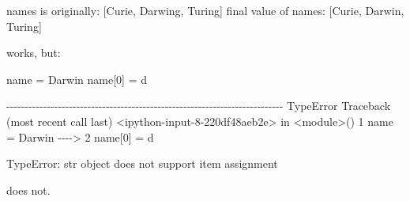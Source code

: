 \documentclass[
  letterpaper,
  DIV=11,
  numbers=noendperiod]{scrartcl}
\newenvironment{Shaded}{\begin{snugshade}}{\end{snugshade}}
\newcommand{\DecValTok}[1]{\textcolor[rgb]{0.68,0.00,0.00}{#1}}
\newcommand{\NormalTok}[1]{\textcolor[rgb]{0.00,0.23,0.31}{#1}}
\newcommand{\OperatorTok}[1]{\textcolor[rgb]{0.37,0.37,0.37}{#1}}
\newcommand{\StringTok}[1]{\textcolor[rgb]{0.13,0.47,0.30}{#1}}
\theoremstyle{remark}
\begin{document}
\begin{Shaded}
\begin{Highlighting}[]
\NormalTok{names is originally: [\textquotesingle{}Curie\textquotesingle{}, \textquotesingle{}Darwing\textquotesingle{}, \textquotesingle{}Turing\textquotesingle{}]}
\NormalTok{final value of names: [\textquotesingle{}Curie\textquotesingle{}, \textquotesingle{}Darwin\textquotesingle{}, \textquotesingle{}Turing\textquotesingle{}]}
\end{Highlighting}
\end{Shaded}

works, but:

\begin{Shaded}
\begin{Highlighting}[]
\NormalTok{name }\OperatorTok{=} \StringTok{\textquotesingle{}Darwin\textquotesingle{}}
\NormalTok{name[}\DecValTok{0}\NormalTok{] }\OperatorTok{=} \StringTok{\textquotesingle{}d\textquotesingle{}}
\end{Highlighting}
\end{Shaded}

\begin{Shaded}
\begin{Highlighting}[]
\NormalTok{{-}{-}{-}{-}{-}{-}{-}{-}{-}{-}{-}{-}{-}{-}{-}{-}{-}{-}{-}{-}{-}{-}{-}{-}{-}{-}{-}{-}{-}{-}{-}{-}{-}{-}{-}{-}{-}{-}{-}{-}{-}{-}{-}{-}{-}{-}{-}{-}{-}{-}{-}{-}{-}{-}{-}{-}{-}{-}{-}{-}{-}{-}{-}{-}{-}{-}{-}{-}{-}{-}{-}{-}{-}{-}{-}}
\NormalTok{TypeError                                 Traceback (most recent call last)}
\NormalTok{\textless{}ipython{-}input{-}8{-}220df48aeb2e\textgreater{} in \textless{}module\textgreater{}()}
\NormalTok{      1 name = \textquotesingle{}Darwin\textquotesingle{}}
\NormalTok{{-}{-}{-}{-}\textgreater{} 2 name[0] = \textquotesingle{}d\textquotesingle{}}

\NormalTok{TypeError: \textquotesingle{}str\textquotesingle{} object does not support item assignment}
\end{Highlighting}
\end{Shaded}

does not.
\end{document}
